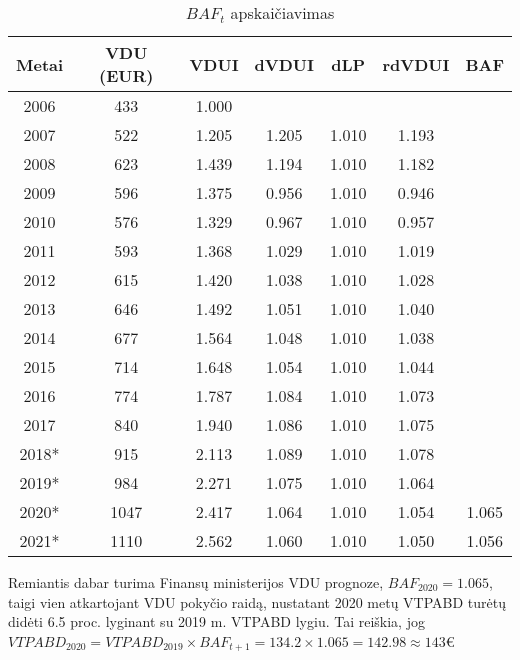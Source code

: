 \documentclass[titlepage, 11pt]{article}
\begin{document}
\begin{table}[H]
\begin{center}
\begin{tabular}{|c|c|c|c|c|c|c|}
\hline
Metai & VDU (EUR) & VDUI  & dVDUI & dLP   & rdVDUI & BAF   \\ \hline
2006  & 433       & 1.000 &       &       &        &       \\ \hline
2007  & 522       & 1.205 & 1.205 & 1.010 & 1.193  &       \\ \hline
2008  & 623       & 1.439 & 1.194 & 1.010 & 1.182  &       \\ \hline
2009  & 596       & 1.375 & 0.956 & 1.010 & 0.946  &       \\ \hline
2010  & 576       & 1.329 & 0.967 & 1.010 & 0.957  &       \\ \hline
2011  & 593       & 1.368 & 1.029 & 1.010 & 1.019  &       \\ \hline
2012  & 615       & 1.420 & 1.038 & 1.010 & 1.028  &       \\ \hline
2013  & 646       & 1.492 & 1.051 & 1.010 & 1.040  &       \\ \hline
2014  & 677       & 1.564 & 1.048 & 1.010 & 1.038  &       \\ \hline
2015  & 714       & 1.648 & 1.054 & 1.010 & 1.044  &       \\ \hline
2016  & 774       & 1.787 & 1.084 & 1.010 & 1.073  &       \\ \hline
2017  & 840       & 1.940 & 1.086 & 1.010 & 1.075  &       \\ \hline
2018*  & 915       & 2.113 & 1.089 & 1.010 & 1.078  &       \\ \hline
2019*  & 984       & 2.271 & 1.075 & 1.010 & 1.064  &       \\ \hline
2020*  & 1047      & 2.417 & 1.064 & 1.010 & 1.054  & 1.065 \\ \hline
2021*  & 1110      & 2.562 & 1.060 & 1.010 & 1.050  & 1.056 \\ \hline
\end{tabular}
\caption{$BAF_t$ apskaičiavimas}
\end{center}
\end{table}


Remiantis dabar turima Finansų ministerijos VDU prognoze, $BAF_{2020}=1.065$, taigi vien atkartojant VDU pokyčio raidą, nustatant 2020 metų VTPABD turėtų didėti 6.5 proc. lyginant su 2019 m. VTPABD lygiu. Tai reiškia, jog $VTPABD_{2020}=VTPABD_{2019} \times BAF_{t+1}=134.2 \times 1.065=142.98 \approx 143$€
\end{document}
